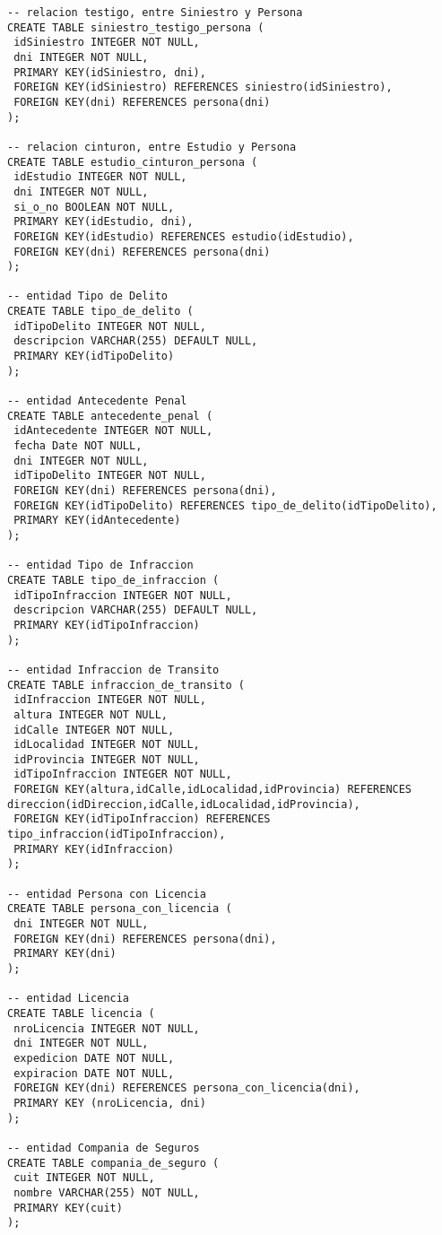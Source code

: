 \begin{verbatim}
-- relacion testigo, entre Siniestro y Persona
CREATE TABLE siniestro_testigo_persona (
 idSiniestro INTEGER NOT NULL,
 dni INTEGER NOT NULL,
 PRIMARY KEY(idSiniestro, dni),
 FOREIGN KEY(idSiniestro) REFERENCES siniestro(idSiniestro),
 FOREIGN KEY(dni) REFERENCES persona(dni)
);

-- relacion cinturon, entre Estudio y Persona
CREATE TABLE estudio_cinturon_persona (
 idEstudio INTEGER NOT NULL,
 dni INTEGER NOT NULL,
 si_o_no BOOLEAN NOT NULL,
 PRIMARY KEY(idEstudio, dni),
 FOREIGN KEY(idEstudio) REFERENCES estudio(idEstudio),
 FOREIGN KEY(dni) REFERENCES persona(dni)
);

-- entidad Tipo de Delito
CREATE TABLE tipo_de_delito (
 idTipoDelito INTEGER NOT NULL,
 descripcion VARCHAR(255) DEFAULT NULL,
 PRIMARY KEY(idTipoDelito)
);

-- entidad Antecedente Penal
CREATE TABLE antecedente_penal (
 idAntecedente INTEGER NOT NULL,
 fecha Date NOT NULL,
 dni INTEGER NOT NULL,
 idTipoDelito INTEGER NOT NULL,
 FOREIGN KEY(dni) REFERENCES persona(dni),
 FOREIGN KEY(idTipoDelito) REFERENCES tipo_de_delito(idTipoDelito),
 PRIMARY KEY(idAntecedente)
);

-- entidad Tipo de Infraccion
CREATE TABLE tipo_de_infraccion (
 idTipoInfraccion INTEGER NOT NULL,
 descripcion VARCHAR(255) DEFAULT NULL,
 PRIMARY KEY(idTipoInfraccion)
);

-- entidad Infraccion de Transito
CREATE TABLE infraccion_de_transito (
 idInfraccion INTEGER NOT NULL,
 altura INTEGER NOT NULL,
 idCalle INTEGER NOT NULL,
 idLocalidad INTEGER NOT NULL,
 idProvincia INTEGER NOT NULL,
 idTipoInfraccion INTEGER NOT NULL,
 FOREIGN KEY(altura,idCalle,idLocalidad,idProvincia) REFERENCES direccion(idDireccion,idCalle,idLocalidad,idProvincia),
 FOREIGN KEY(idTipoInfraccion) REFERENCES tipo_infraccion(idTipoInfraccion),
 PRIMARY KEY(idInfraccion)
);

-- entidad Persona con Licencia
CREATE TABLE persona_con_licencia (
 dni INTEGER NOT NULL,
 FOREIGN KEY(dni) REFERENCES persona(dni),
 PRIMARY KEY(dni)
);

-- entidad Licencia
CREATE TABLE licencia (
 nroLicencia INTEGER NOT NULL,
 dni INTEGER NOT NULL,
 expedicion DATE NOT NULL,
 expiracion DATE NOT NULL,
 FOREIGN KEY(dni) REFERENCES persona_con_licencia(dni),
 PRIMARY KEY (nroLicencia, dni)
);

-- entidad Compania de Seguros
CREATE TABLE compania_de_seguro (
 cuit INTEGER NOT NULL,
 nombre VARCHAR(255) NOT NULL,
 PRIMARY KEY(cuit)
);


\end{verbatim}
